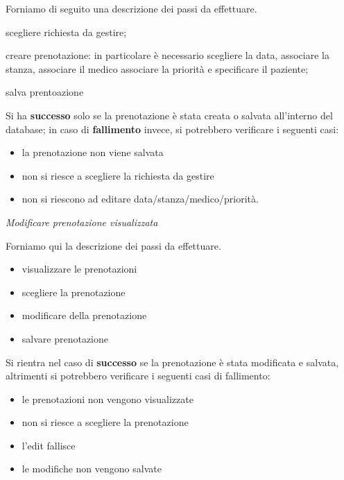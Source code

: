 \begin{description}
\begin{itemize}
  Forniamo di seguito una descrizione dei passi da effettuare.
  \begin{description}
  \item scegliere richiesta da gestire;
  \item creare prenotazione: in particolare è necessario scegliere la data,
                        associare la stanza,
                        associare il medico
                        associare la priorità e
                        specificare il paziente;

  \item salva prentoazione
  \end{description}
  
  Si ha \textbf{successo} solo se la prenotazione è stata creata o salvata all'interno
  del database; in caso di \textbf{fallimento} invece, si potrebbero verificare i
  seguenti casi:
  \begin{itemize}
  \item la prenotazione non viene salvata
  \item non si riesce a scegliere la richiesta da gestire
  \item non si riescono ad editare data/stanza/medico/priorità.
  \end{itemize}

                                                                                                                                   

\diam \textit{Modificare prenotazione visualizzata}

  Forniamo qui la descrizione dei passi da effettuare.
  \begin{itemize}
  \item visualizzare le prenotazioni
  \item scegliere la prenotazione
  \item modificare della prenotazione
  \item salvare prenotazione
  \end{itemize}
  
  Si rientra nel caso di \textbf{successo} se la prenotazione è stata modificata e 
  salvata, altrimenti si potrebbero verificare i seguenti casi di fallimento:
  \begin{itemize} 
  \item le prenotazioni non vengono visualizzate
  \item non si riesce a scegliere la prenotazione
  \item l'edit fallisce
  \item le modifiche non vengono salvate    
  \end{itemize}   


\end{itemize}
\end{description}
